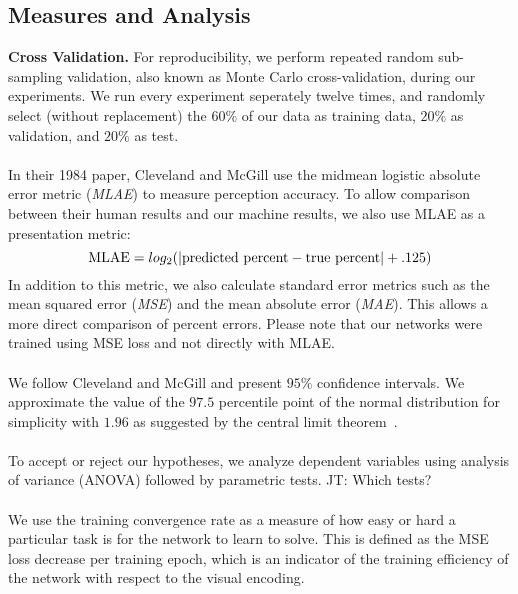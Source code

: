 \subsection{Measures and Analysis}
\label{sec:measuresandanalysis}

\noindent\textbf{Cross Validation.} For reproducibility, we perform repeated random sub-sampling validation, also known as Monte Carlo cross-validation, during our experiments. We run every experiment seperately twelve times, and randomly select (without replacement) the $60\%$ of our data as training data, $20\%$ as validation, and $20\%$ as test. 
\\~\\
 In their 1984 paper, Cleveland and McGill use the midmean logistic absolute error metric (\emph{MLAE}) to measure perception accuracy. To allow comparison between their human results and our machine results, we also use MLAE as a presentation metric:
\begin{equation}
	\textnormal{MLAE} = log_2( | \textnormal{predicted percent} - \textnormal{true percent} | + .125)
\end{equation}
In addition to this metric, we also calculate standard error metrics such as the mean squared error (\emph{MSE}) and the mean absolute error (\emph{MAE}). This allows a more direct comparison of percent errors. Please note that our networks were trained using MSE loss and not directly with MLAE.
\\~\\
 We follow Cleveland and McGill and present $95\%$ confidence intervals. We approximate the value of the $97.5$ percentile point of the normal distribution for simplicity with $1.96$ as suggested by the central limit theorem~\cite{central_limit}.
\\~\\
 To accept or reject our hypotheses, we analyze dependent variables using analysis of variance (ANOVA) followed by parametric tests. JT: Which tests?
\\~\\
 We use the training convergence rate as a measure of how easy or hard a particular task is for the network to learn to solve. This is defined as the MSE loss decrease per training epoch, which is an indicator of the training efficiency of the network with respect to the visual encoding.
